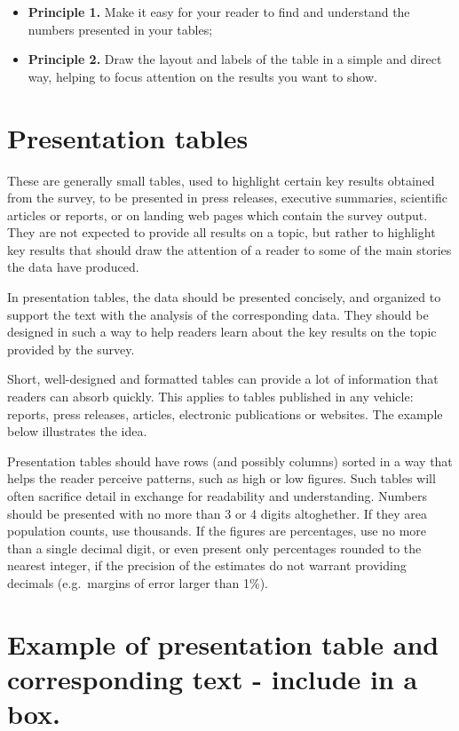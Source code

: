 \documentclass[
  12pt,
]{book}
\begin{document}
\begin{itemize}
\item
  \textbf{Principle 1.} Make it easy for your reader to find and understand the numbers presented in your tables;
\item
  \textbf{Principle 2.} Draw the layout and labels of the table in a simple and direct way, helping to focus attention on the results you want to show.
\end{itemize}

\section{Presentation tables}\label{presentation-tables}

These are generally small tables, used to highlight certain key results obtained from the survey, to be presented in press releases, executive summaries, scientific articles or reports, or on landing web pages which contain the survey output. They are not expected to provide all results on a topic, but rather to highlight key results that should draw the attention of a reader to some of the main stories the data have produced.

In presentation tables, the data should be presented concisely, and organized to support the text with the analysis of the corresponding data. They should be designed in such a way to help readers learn about the key results on the topic provided by the survey.

Short, well-designed and formatted tables can provide a lot of information that readers can absorb quickly. This applies to tables published in any vehicle: reports, press releases, articles, electronic publications or websites. The example below illustrates the idea.

Presentation tables should have rows (and possibly columns) sorted in a way that helps the reader perceive patterns, such as high or low figures. Such tables will often sacrifice detail in exchange for readability and understanding. Numbers should be presented with no more than 3 or 4 digits altoghether. If they area population counts, use thousands. If the figures are percentages, use no more than a single decimal digit, or even present only percentages rounded to the nearest integer, if the precision of the estimates do not warrant providing decimals (e.g.~margins of error larger than 1\%).

\section{Example of presentation table and corresponding text - include in a box.}\label{example-of-presentation-table-and-corresponding-text---include-in-a-box.}
\end{document}
